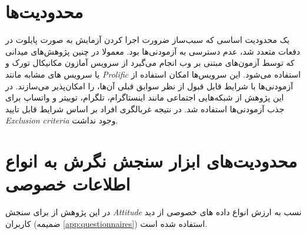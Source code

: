 \section{محدودیت‌ها}
یک محدودیت اساسی  که سبب‌ساز ضرورت اجرا کردن آزمایش به صورت پایلوت در دفعات متعدد شد، عدم دسترسی به آزمودنی‌ها بود. معمولا در چنین پژوهش‌های میدانی که توسط آزمون‌های مبتنی بر وب انجام می‌گیرد از سرویس آمازون مکانیکال تورک و یا سرویس های مشابه مانند 
\textit{
    \gls{Prolific}
}
استفاده می‌شود. این سرویس‌ها امکان استفاده از آزمودنی‌ها با شرایط قابل قبول از نظر سوابق قبلی آن‌ها، را امکان‌پذیر می‌سازند. در این پژوهش از شبکه‌هایی اجتماعی مانند اینستاگرام، تلگرام، توییتر و واتساپ برای جذب آزمودنی‌ها استفاده شد. در نتیجه غربالگری افراد بر اساس شرایط قابل تایید 
\textit{
    \gls{Exclusion criteria}
}
وجود نداشت.
\section{محدودیت‌های ابزار سنجش نگرش به انواع اطلاعات خصوصی}
در این پژوهش از برای سنجش 
{\textit{\gls{Attitude}}}
نسب به ارزش انواع داده های خصوصی از دید کاربران 
(ضمیمه \ref{app:questionnaires})
استفاده شده است.
